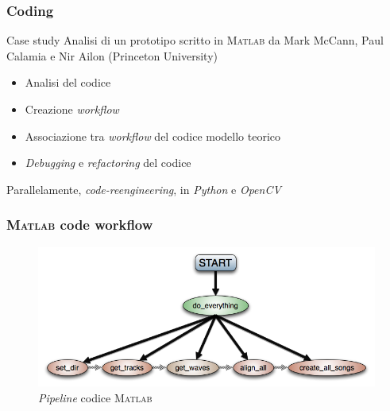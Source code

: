 \begin{frame}
\frametitle{Coding}
\begin{block}{Case study}
Analisi di un prototipo scritto in \textsc{Matlab} da Mark McCann, Paul Calamia
e Nir Ailon (Princeton University)
\end{block}

\begin{block}{}
\begin{itemize}
\item Analisi del codice
\item Creazione \emph{workflow}
\item Associazione tra \emph{workflow} del codice modello teorico
\item \textit{Debugging} e \textit{refactoring} del codice
\end{itemize}
\end{block}

\begin{block}{}
Parallelamente, \emph{code-reengineering}, in \emph{Python}
e \emph{OpenCV}
\end{block}
\end{frame}

\begin{frame}
\frametitle{\textsc{Matlab} code workflow}
\begin{figure}
\includegraphics[width=\textwidth]{immagini/workflow.png}
\caption{\emph{Pipeline} codice \textsc{Matlab}}
\end{figure}
\end{frame}

